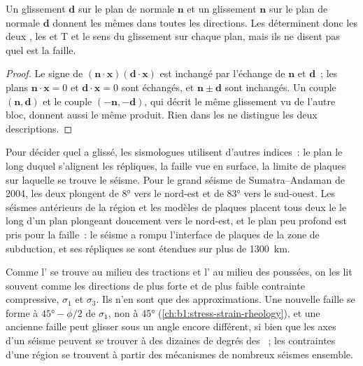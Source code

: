 \begin{proposition}\label{prop:b1:earthquake-source:auxiliary}
Un glissement $\mathbf d$ sur le plan de normale $\mathbf n$ et un glissement $\mathbf n$ sur
le plan de normale $\mathbf d$ donnent les mêmes  dans toutes les directions.
Les  déterminent donc les deux , les  et T et
le sens du glissement sur chaque plan, mais ils ne disent pas quel  est la
faille.
\end{proposition}

\begin{proof}
Le signe de $(\mathbf n\cdot\mathbf x)(\mathbf d\cdot\mathbf x)$ est inchangé
par l'échange de $\mathbf n$ et $\mathbf d$~; les plans
$\mathbf n\cdot\mathbf x = 0$ et $\mathbf d\cdot\mathbf x = 0$ sont échangés,
et $\mathbf n \pm \mathbf d$ sont inchangés. Un couple $(\mathbf n, \mathbf d)$ et
le couple $(-\mathbf n, -\mathbf d)$, qui décrit le même glissement vu de
l'autre bloc, donnent aussi le même produit. Rien dans les 
ne distingue les deux descriptions.
\end{proof}

Pour décider quel  a glissé, les sismologues utilisent d'autres indices~: le
plan le long duquel s'alignent les répliques, la faille vue en surface, la
limite de plaques sur laquelle se trouve le séisme. Pour le grand séisme de Sumatra--Andaman de
2004, les deux  plongent de \ang{8} vers le nord-est et de
\ang{83} vers le sud-ouest. Les séismes antérieurs de la région et les
modèles de plaques placent tous deux le  le long d'un plan plongeant doucement vers le
nord-est, et le plan peu profond est pris pour la faille~: le séisme a rompu
l'interface de plaques de la zone de subduction, et ses répliques se sont étendues sur
plus de \qty{1300}{km}.

Comme l' se trouve au milieu des tractions et l' au milieu
des poussées, on les lit souvent comme les directions de plus forte et de plus faible
contrainte compressive, $\sigma_1$ et $\sigma_3$. Ils n'en sont que des approximations.
Une nouvelle faille se forme à $\ang{45} - \phi/2$ de $\sigma_1$, non à \ang{45}
(\cref{ch:b1:stress-strain-rheology}), et une ancienne faille peut glisser sous un angle encore
différent, si bien que les axes d'un séisme peuvent se trouver à des dizaines de degrés des
~; les contraintes d'une région se trouvent à partir des mécanismes
de nombreux séismes ensemble.

